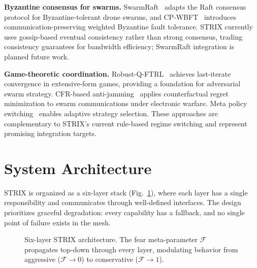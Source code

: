 \documentclass[conference]{IEEEtran}
\newcommand{\fear}{\mathcal{F}}
\begin{document}
\textbf{Byzantine consensus for swarms.}\quad
SwarmRaft~\cite{swarmraft2025} adapts the Raft consensus protocol for
Byzantine-tolerant drone swarms, and CP-WBFT~\cite{cpwbft2025}
introduces communication-preserving weighted Byzantine fault tolerance.
STRIX currently uses gossip-based eventual consistency rather than
strong consensus, trading consistency guarantees for bandwidth
efficiency; SwarmRaft integration is planned future work.

\textbf{Game-theoretic coordination.}\quad
Robust-Q-FTRL~\cite{robust_q_ftrl2025} achieves last-iterate
convergence in extensive-form games, providing a foundation for
adversarial swarm strategy.  CFR-based anti-jamming~\cite{cfr_antijamming2025}
applies counterfactual regret minimization to swarm communications
under electronic warfare.  Meta policy switching~\cite{metapolicy2025}
enables adaptive strategy selection.  These approaches are
complementary to STRIX's current rule-based regime switching and
represent promising integration targets.


\section{System Architecture}
\label{sec:arch}

STRIX is organized as a six-layer stack (Fig.~\ref{fig:architecture}),
where each layer has a single responsibility and communicates through
well-defined interfaces.  The design prioritizes graceful degradation:
every capability has a fallback, and no single point of failure exists
in the mesh.

\begin{figure}[t]
\centering
{}
\caption{Six-layer STRIX architecture.  The fear meta-parameter
$\fear$ propagates top-down through every layer, modulating behavior
from aggressive ($\fear\!\to\!0$) to conservative ($\fear\!\to\!1$).}
\label{fig:architecture}
\end{figure}
\end{document}
